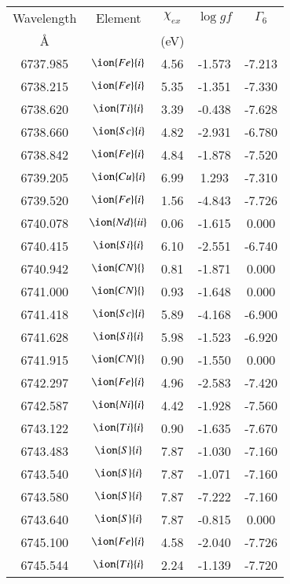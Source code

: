 \documentclass[fleqn,usenatbib]{mnras}
\begin{document}
\begin{center}
 \begin{table}
 \begin{tabular}{ccccc}
 \hline
 Wavelength & Element & $\chi_{ex}$ &  $\log gf$ & $\varGamma_{6}$ \\
   \AA{}    &         &  (eV)       &            &                 \\
 \hline
6737.985 &  $\ion{Fe}{i}$  & 4.56 & -1.573 & -7.213 \\ 
6738.215 &  $\ion{Fe}{i}$  & 5.35 & -1.351 & -7.330 \\ 
6738.620 &  $\ion{Ti}{i}$  & 3.39 & -0.438 & -7.628 \\ 
6738.660 &  $\ion{Sc}{i}$  & 4.82 & -2.931 & -6.780 \\ 
6738.842 &  $\ion{Fe}{i}$  & 4.84 & -1.878 & -7.520 \\ 
6739.205 &  $\ion{Cu}{i}$  & 6.99 & 1.293 & -7.310 \\ 
6739.520 &  $\ion{Fe}{i}$  & 1.56 & -4.843 & -7.726 \\ 
6740.078 &  $\ion{Nd}{ii}$  & 0.06 & -1.615 & 0.000 \\ 
6740.415 &  $\ion{Si}{i}$  & 6.10 & -2.551 & -6.740 \\ 
6740.942 & $\ion{CN}{}$ & 0.81 & -1.871 & 0.000 \\ 
6741.000 & $\ion{CN}{}$ & 0.93 & -1.648 & 0.000 \\ 
6741.418 &  $\ion{Sc}{i}$  & 5.89 & -4.168 & -6.900 \\ 
6741.628 &  $\ion{Si}{i}$  & 5.98 & -1.523 & -6.920 \\ 
6741.915 & $\ion{CN}{}$ & 0.90 & -1.550 & 0.000 \\ 
6742.297 &  $\ion{Fe}{i}$  & 4.96 & -2.583 & -7.420 \\ 
6742.587 &  $\ion{Ni}{i}$  & 4.42 & -1.928 & -7.560 \\ 
6743.122 &  $\ion{Ti}{i}$  & 0.90 & -1.635 & -7.670 \\ 
6743.483 &  $\ion{S}{i}$  & 7.87 & -1.030 & -7.160 \\ 
6743.540 &  $\ion{S}{i}$  & 7.87 & -1.071 & -7.160 \\ 
6743.580 &  $\ion{S}{i}$  & 7.87 & -7.222 & -7.160 \\ 
6743.640 &  $\ion{S}{i}$  & 7.87 & -0.815 & 0.000 \\ 
6745.100 &  $\ion{Fe}{i}$  & 4.58 & -2.040 & -7.726 \\ 
6745.544 &  $\ion{Ti}{i}$  & 2.24 & -1.139 & -7.720 \\ 

\end{tabular}
\end{table}
\end{center}
\end{document}
